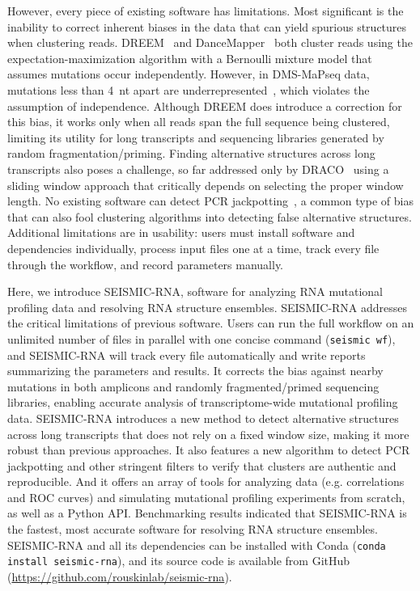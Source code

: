 \documentclass[11pt]{article}
\begin{document}
However, every piece of existing software has limitations.
Most significant is the inability to correct inherent biases in the data that can yield spurious structures when clustering reads.
DREEM~\cite{Tomezsko2020} and DanceMapper~\cite{Olson2022} both cluster reads using the expectation-maximization algorithm with a Bernoulli mixture model that assumes mutations occur independently.
However, in DMS-MaPseq data, mutations less than 4~nt apart are underrepresented~\cite{Tomezsko2020}, which violates the assumption of independence.
Although DREEM does introduce a correction for this bias, it works only when all reads span the full sequence being clustered, limiting its utility for long transcripts and sequencing libraries generated by random fragmentation/priming.
Finding alternative structures across long transcripts also poses a challenge, so far addressed only by DRACO~\cite{Morandi2021} using a sliding window approach that critically depends on selecting the proper window length.
No existing software can detect PCR jackpotting~\cite{Marotz2019}, a common type of bias that can also fool clustering algorithms into detecting false alternative structures.
Additional limitations are in usability: users must install software and dependencies individually, process input files one at a time, track every file through the workflow, and record parameters manually.

Here, we introduce SEISMIC-RNA, software for analyzing RNA mutational profiling data and resolving RNA structure ensembles.
SEISMIC-RNA addresses the critical limitations of previous software.
Users can run the full workflow on an unlimited number of files in parallel with one concise command (\verb|seismic wf|), and SEISMIC-RNA will track every file automatically and write reports summarizing the parameters and results.
It corrects the bias against nearby mutations in both amplicons and randomly fragmented/primed sequencing libraries, enabling accurate analysis of transcriptome-wide mutational profiling data.
SEISMIC-RNA introduces a new method to detect alternative structures across long transcripts that does not rely on a fixed window size, making it more robust than previous approaches.
It also features a new algorithm to detect PCR jackpotting and other stringent filters to verify that clusters are authentic and reproducible.
And it offers an array of tools for analyzing data (e.g. correlations and ROC curves) and simulating mutational profiling experiments from scratch, as well as a Python API.
Benchmarking results indicated that SEISMIC-RNA is the fastest, most accurate software for resolving RNA structure ensembles.
SEISMIC-RNA and all its dependencies can be installed with Conda (\verb|conda install seismic-rna|), and its source code is available from GitHub (\url{https://github.com/rouskinlab/seismic-rna}).
\end{document}
